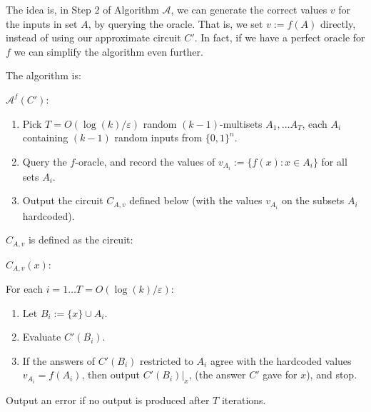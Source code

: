 \documentclass[]{article}
\newcommand{\1}{\mathbb{1}}
\renewcommand{\epsilon}{\varepsilon}
\newcommand{\A}{\mathcal{A}}
\begin{document}
The idea is, in Step 2 of Algorithm $\A$,
we can generate the correct values $v$ for the inputs
in set $A$, by querying the oracle.
That is, we set $v := f(A)$ directly, instead of using our approximate circuit
$C'$.
In fact, if we have a perfect oracle for $f$ we can simplify the algorithm even
further.


The algorithm is:
\begin{mdframed}
$\mathcal{A}^f(C')$:

\begin{enumerate}
    \item
        Pick
        $T = O(\log(k)/\epsilon)$
    random $(k-1)$-multisets $A_1, \dots A_T$,
    each $A_i$ containing $(k-1)$ random inputs from $\{0, 1\}^n$.
\item Query the $f$-oracle, and record the values of $v_{A_i} := \{f(x): x \in A_i\}$
    for all sets $A_i$.
\item Output the circuit $C_{A, v}$
    defined below (with the values $v_{A_i}$ on the subsets $A_i$ hardcoded).
\end{enumerate}
\end{mdframed}

$C_{A, v}$ is defined as the circuit:\\
\begin{mdframed}
    $C_{A, v}(x)$:

    For each $i = 1 \dots T = O(\log(k)/\epsilon)$:
\begin{enumerate}
    \item Let $B_i := \{x\} \cup A_i$.
    \item Evaluate $C'(B_i)$.
    \item If the answers of $C'(B_i)$ restricted to $A_i$ agree with the hardcoded
        values $v_{A_i} = f(A_i)$, then output $C'(B_i)|_x$, (the answer $C'$ gave for
        $x$), and stop.
\end{enumerate}
Output an error if no output is produced after $T$ iterations.
\end{mdframed}
\end{document}
